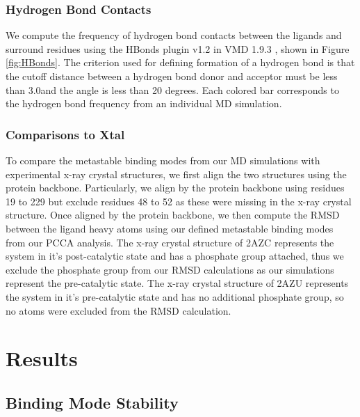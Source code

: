 \documentclass[fleqn,10pt]{wlscirep}
\newcommand{\angstrom}{\text{\normalfont\AA}}
\begin{document}
\subsubsection{Hydrogen Bond Contacts}

We compute the frequency of hydrogen bond contacts between the ligands and surround residues using the HBonds plugin v1.2 in VMD 1.9.3 \cite{humphrey1996vmd}, shown in Figure \ref{fig:HBonds}.
The criterion used for defining formation of a hydrogen bond is that the cutoff distance between a hydrogen bond donor and acceptor must be less than 3.0\angstrom and the angle is less than 20 degrees.
Each colored bar corresponds to the hydrogen bond frequency from an individual MD simulation.


\subsubsection{Comparisons to Xtal}
To compare the metastable binding modes from our MD simulations with experimental x-ray crystal structures, we first align the two structures using the protein backbone.
Particularly, we align by the protein backbone using residues 19 to 229 but exclude residues 48 to 52 as these were missing in the x-ray crystal structure.
Once aligned by the protein backbone, we then compute the RMSD between the ligand heavy atoms using our defined metastable binding modes from our PCCA analysis.
The x-ray crystal structure of 2AZC represents the system in it's post-catalytic state and has a phosphate group attached, thus we exclude the phosphate group from our RMSD calculations as our simulations represent the pre-catalytic state.
The x-ray crystal structure of 2AZU represents the system in it's pre-catalytic state and has no additional phosphate group, so no atoms were excluded from the RMSD calculation.


\section{Results}

\subsection{Binding Mode Stability}
\end{document}
